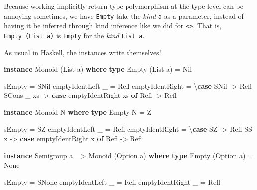 \documentclass[]{article}
\newenvironment{Shaded}{}{}
\newcommand{\DataTypeTok}[1]{\textcolor[rgb]{0.56,0.13,0.00}{#1}}
\newcommand{\FunctionTok}[1]{\textcolor[rgb]{0.02,0.16,0.49}{#1}}
\newcommand{\KeywordTok}[1]{\textcolor[rgb]{0.00,0.44,0.13}{\textbf{#1}}}
\newcommand{\NormalTok}[1]{#1}
\newcommand{\OtherTok}[1]{\textcolor[rgb]{0.00,0.44,0.13}{#1}}
\begin{document}
Because working implicitly return-type polymorphism at the type level can be
annoying sometimes, we have \texttt{Empty} take the \emph{kind} \texttt{a} as a
parameter, instead of having it be inferred through kind inference like we did
for \texttt{\textless{}\textgreater{}}. That is, \texttt{Empty\ (List\ a)} is
\texttt{Empty} for the \emph{kind} \texttt{List\ a}.

As usual in Haskell, the instances write themselves!

\begin{Shaded}
\begin{Highlighting}[]
\KeywordTok{instance} \DataTypeTok{Monoid}\NormalTok{ (}\DataTypeTok{List}\NormalTok{ a) }\KeywordTok{where}
    \KeywordTok{type} \DataTypeTok{Empty}\NormalTok{ (}\DataTypeTok{List}\NormalTok{ a) }\FunctionTok{=} \DataTypeTok{Nil}

\NormalTok{    sEmpty }\FunctionTok{=} \DataTypeTok{SNil}
\NormalTok{    emptyIdentLeft _ }\FunctionTok{=} \DataTypeTok{Refl}
\NormalTok{    emptyIdentRight  }\FunctionTok{=}\NormalTok{ \textbackslash{}}\KeywordTok{case}
      \DataTypeTok{SNil} \OtherTok{->} \DataTypeTok{Refl}
      \DataTypeTok{SCons}\NormalTok{ _ xs }\OtherTok{->}
        \KeywordTok{case}\NormalTok{ emptyIdentRight xs }\KeywordTok{of}
          \DataTypeTok{Refl} \OtherTok{->} \DataTypeTok{Refl}

\KeywordTok{instance} \DataTypeTok{Monoid} \DataTypeTok{N} \KeywordTok{where}
    \KeywordTok{type} \DataTypeTok{Empty} \DataTypeTok{N} \FunctionTok{=} \DataTypeTok{Z}

\NormalTok{    sEmpty }\FunctionTok{=} \DataTypeTok{SZ}
\NormalTok{    emptyIdentLeft _ }\FunctionTok{=} \DataTypeTok{Refl}
\NormalTok{    emptyIdentRight  }\FunctionTok{=}\NormalTok{ \textbackslash{}}\KeywordTok{case}
      \DataTypeTok{SZ} \OtherTok{->} \DataTypeTok{Refl}
      \DataTypeTok{SS}\NormalTok{ x }\OtherTok{->} \KeywordTok{case}\NormalTok{ emptyIdentRight x }\KeywordTok{of}
        \DataTypeTok{Refl} \OtherTok{->} \DataTypeTok{Refl}

\KeywordTok{instance} \DataTypeTok{Semigroup}\NormalTok{ a }\OtherTok{=>} \DataTypeTok{Monoid}\NormalTok{ (}\DataTypeTok{Option}\NormalTok{ a) }\KeywordTok{where}
    \KeywordTok{type} \DataTypeTok{Empty}\NormalTok{ (}\DataTypeTok{Option}\NormalTok{ a) }\FunctionTok{=} \DataTypeTok{None}

\NormalTok{    sEmpty }\FunctionTok{=} \DataTypeTok{SNone}
\NormalTok{    emptyIdentLeft  _ }\FunctionTok{=} \DataTypeTok{Refl}
\NormalTok{    emptyIdentRight _ }\FunctionTok{=} \DataTypeTok{Refl}
\end{Highlighting}
\end{Shaded}
\end{document}
